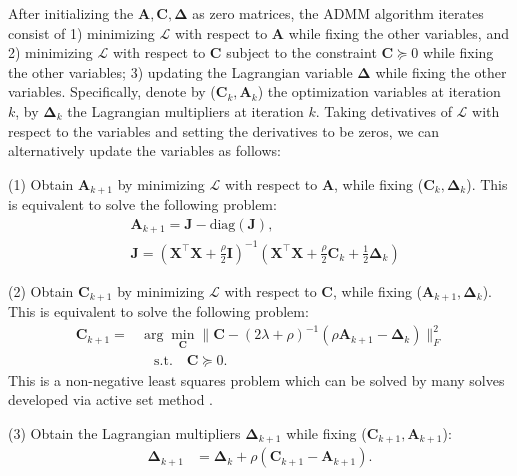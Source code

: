 \documentclass[10pt,twocolumn,letterpaper]{article}
\begin{document}
After initializing the $\bm{A},\bm{C},\bm{\Delta}$ as zero matrices, the ADMM algorithm iterates consist of 1) minimizing $\mathcal{L}$ with respect to $\bm{A}$ while fixing the other variables, and 2) minimizing $\mathcal{L}$ with respect to $\bm{C}$ subject to the constraint $\bm{C}\succcurlyeq0$ while fixing the other variables; 3) updating the Lagrangian variable $\bm{\Delta}$ while fixing the other variables. Specifically, denote by ($\bm{C}_{k},\bm{A}_{k}$) the optimization variables at iteration $k$, by $\bm{\Delta}_{k}$ the Lagrangian multipliers at iteration $k$. Taking detivatives of $\mathcal{L}$ with respect to the variables and setting the derivatives to be zeros, we can alternatively update the variables as follows:

(1) Obtain $\bm{A}_{k+1}$ by minimizing $\mathcal{L}$ with respect to $\bm{A}$, while fixing ($\bm{C}_{k},\bm{\Delta}_{k}$). This is equivalent to solve the following problem:
\begin{equation}
\begin{split}
\label{e14}
&
\bm{A}_{k+1}
=
\bm{J}-\text{diag}(\bm{J}),
\\
&
\bm{J}
=
(\bm{X}^{\top}\bm{X}+\frac{\rho}{2}\bm{I})^{-1}
(\bm{X}^{\top}\bm{X}+\frac{\rho}{2}\bm{C}_{k}+\frac{1}{2}\bm{\Delta}_{k})
\end{split}
\end{equation}

(2) Obtain $\bm{C}_{k+1}$ by minimizing $\mathcal{L}$ with respect to $\bm{C}$, while fixing ($\bm{A}_{k+1},\bm{\Delta}_{k}$). This is equivalent to solve the following problem:
\begin{equation}
\begin{split}
\label{e15}
\bm{C}_{k+1}
=
&
\arg\min_{\bm{C}}
\|
\bm{C}-(2\lambda+\rho)^{-1}(\rho\bm{A}_{k+1}-\bm{\Delta}_{k})
\|_{F}^{2}
\\
&
\quad
\text{s.t.}
\quad 
\bm{C}\succcurlyeq 0
.
\end{split}
\end{equation}
This is a non-negative least squares problem which can be solved by many solves developed via active set method \cite{Nocedal2006NO}.

(3) Obtain the Lagrangian multipliers $\bm{\Delta}_{k+1}$ while fixing ($\bm{C}_{k+1},\bm{A}_{k+1}$):
\begin{equation}
\begin{split}
\label{e16}
\bm{\Delta}_{k+1}
&
=
\bm{\Delta}_{k}
+
\rho
(\bm{C}_{k+1}-\bm{A}_{k+1})
.
\end{split}
\end{equation}
\end{document}
